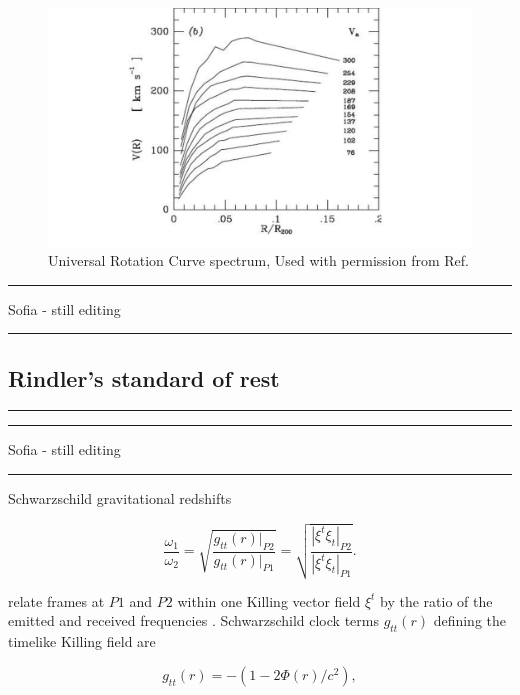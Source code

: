 \documentclass[reprint,%
 amsmath,amssymb,
 aps,
]{revtex4-1}
\begin{document}
 \begin{figure}[h!]
     \centering
     \includegraphics[width=\linewidth]{URC}
     \caption{Universal Rotation Curve spectrum, Used with permission from Ref.\citep{salucci}}
     \label{fig:URC}
\end{figure}

 {\color{teal} \rule{\linewidth}{0.5mm}}
 
 {\color{teal}Sofia - still editing}
 {\color{teal} \rule{\linewidth}{0.5mm}}

 

 \subsection{Rindler's standard of rest}
 {\color{teal} \rule{\linewidth}{0.5mm}}
 
{\color{teal} \rule{\linewidth}{0.5mm}}
 
 {\color{teal}Sofia - still editing}
 {\color{teal} \rule{\linewidth}{0.5mm}}

 
 Schwarzschild gravitational redshifts  
 
     \begin{equation}
       \frac{\omega_1}{\omega_2}  =\sqrt{\frac{g_{tt}(r)|_{P2}}{g_{tt}(r)|_{P1}}} =\sqrt{\frac{|\xi^t\xi_{t}|_{P2}}{|\xi^t\xi_{t}|_{P1}}}. 
      \label{eq:grav}
    \end{equation}
    
  relate    frames   at   $P1$ and $P2$ within one  Killing vector field $\xi^t$ by the ratio of the emitted and received frequencies \cite{Wald}.  
  Schwarzschild clock  terms $g_{tt}(r)$ defining the timelike Killing field      are 
   
  \begin{equation}
      g_{tt}(r)= -( 1 - 2\Phi(r)/ c^2), 
      \label{clocktime}
  \end{equation} 
  
\end{document}
